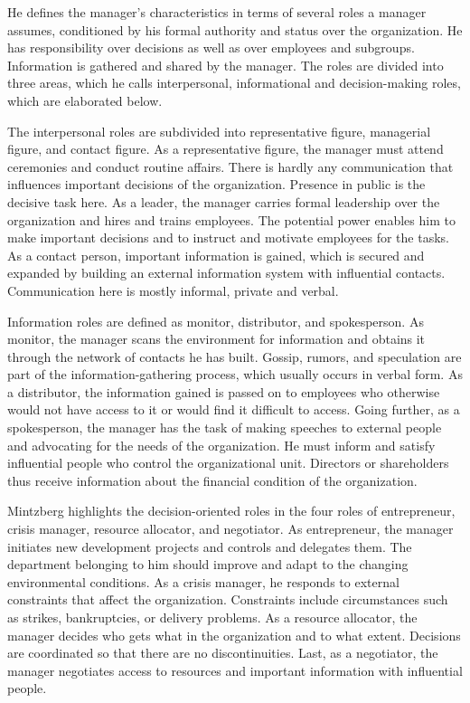 \documentclass[a4paper,12pt]{article}
\begin{document}
He defines the manager's characteristics in terms of several roles a manager
\cite{Mintzberg} assumes, conditioned by his formal authority and status over
the organization. He has responsibility over decisions as well as over
employees and subgroups. Information is gathered and shared by the
manager. The roles are divided into three areas, which he calls interpersonal,
informational and decision-making roles, which are elaborated below.

The interpersonal roles are subdivided into representative figure, managerial
figure, and contact figure. As a representative figure, the manager must
attend ceremonies and conduct routine affairs. There is hardly any
communication that influences important decisions of the
organization. Presence in public is the decisive task here. As a leader, the
manager carries formal leadership over the organization and hires and trains
employees. The potential power enables him to make important decisions and to
instruct and motivate employees for the tasks. As a contact person, important
information is gained, which is secured and expanded by building an external
information system with influential contacts. Communication here is mostly
informal, private and verbal.

Information roles are defined as monitor, distributor, and spokesperson. As
monitor, the manager scans the environment for information and obtains it
through the network of contacts he has built. Gossip, rumors, and speculation
are part of the information-gathering process, which usually occurs in verbal
form. As a distributor, the information gained is passed on to employees who
otherwise would not have access to it or would find it difficult to
access. Going further, as a spokesperson, the manager has the task of making
speeches to external people and advocating for the needs of the
organization. He must inform and satisfy influential people who control the
organizational unit. Directors or shareholders thus receive information about
the financial condition of the organization.

Mintzberg highlights the decision-oriented roles in the four roles of
entrepreneur, crisis manager, resource allocator, and negotiator. As
entrepreneur, the manager initiates new development projects and controls and
delegates them. The department belonging to him should improve and adapt to
the changing environmental conditions. As a crisis manager, he responds to
external constraints that affect the organization. Constraints include
circumstances such as strikes, bankruptcies, or delivery problems. As a
resource allocator, the manager decides who gets what in the organization and
to what extent. Decisions are coordinated so that there are no
discontinuities. Last, as a negotiator, the manager negotiates access to
resources and important information with influential people.
\end{document}
